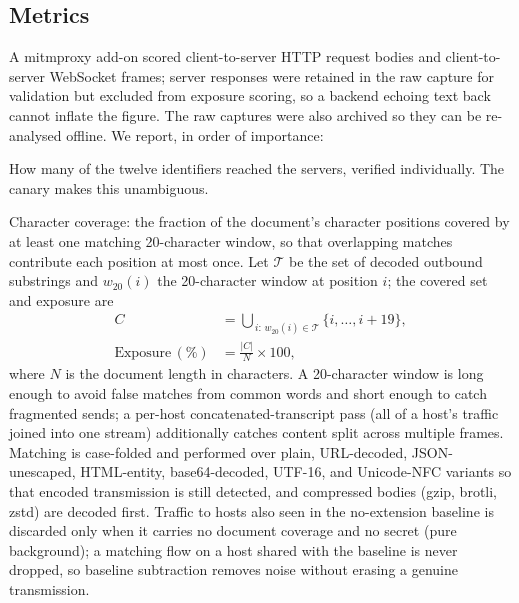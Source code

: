 \documentclass[10pt,conference,a4paper]{IEEEtran}
\begin{document}
\subsection{Metrics}
\label{sec:metrics}

A mitmproxy add-on scored client-to-server HTTP request bodies and client-to-server
WebSocket frames; server responses were retained in the raw capture for validation but
excluded from exposure scoring, so a backend echoing text back cannot inflate the figure.
The raw captures were also archived so they can be re-analysed offline. We report, in order
of importance:

\begin{description}[nosep,style=nextline]
  \item[Planted-secret count (primary).] How many of the twelve identifiers reached
        the servers, verified individually. The canary makes this unambiguous.
  \item[Exposure \%.] Character coverage: the fraction of the document's character
        positions covered by at least one matching 20-character window, so that overlapping
        matches contribute each position at most once. Let $\mathcal{T}$ be the set of
        decoded outbound substrings and $w_{20}(i)$ the 20-character window at position $i$;
        the covered set and exposure are
        \begin{align*}
          C &= \!\!\bigcup_{\,i:\,w_{20}(i)\in\mathcal{T}}\!\!\{i,\ldots,i+19\}, \\
          \mathrm{Exposure}\,(\%) &= \frac{|C|}{N}\times 100,
        \end{align*}
        where $N$ is the document length in characters. A 20-character window is long enough
        to avoid false matches from common words and short enough to catch fragmented sends;
        a per-host concatenated-transcript pass (all of a host's traffic joined into one
        stream) additionally catches content split across multiple frames. Matching is
        case-folded and performed over plain, URL-decoded, JSON-unescaped, HTML-entity,
        base64-decoded, UTF-16, and Unicode-NFC variants so that encoded transmission is
        still detected, and compressed bodies (gzip, brotli, zstd) are decoded first.
        Traffic to hosts also seen in the no-extension baseline is discarded only when it
        carries no document coverage and no secret (pure background); a matching flow on a
        host shared with the baseline is never dropped, so baseline subtraction removes
        noise without erasing a genuine transmission.

\end{description}
\end{document}
